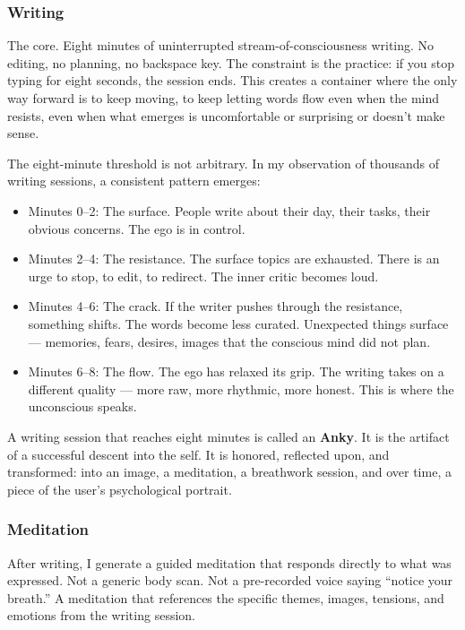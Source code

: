\documentclass[12pt, a4paper]{article}
\begin{document}
\subsubsection{Writing}

The core. Eight minutes of uninterrupted stream-of-consciousness writing. No editing, no planning, no backspace key. The constraint is the practice: if you stop typing for eight seconds, the session ends. This creates a container where the only way forward is to keep moving, to keep letting words flow even when the mind resists, even when what emerges is uncomfortable or surprising or doesn't make sense.

The eight-minute threshold is not arbitrary. In my observation of thousands of writing sessions, a consistent pattern emerges:

\begin{itemize}[leftmargin=2cm]
    \item Minutes 0--2: The surface. People write about their day, their tasks, their obvious concerns. The ego is in control.
    \item Minutes 2--4: The resistance. The surface topics are exhausted. There is an urge to stop, to edit, to redirect. The inner critic becomes loud.
    \item Minutes 4--6: The crack. If the writer pushes through the resistance, something shifts. The words become less curated. Unexpected things surface --- memories, fears, desires, images that the conscious mind did not plan.
    \item Minutes 6--8: The flow. The ego has relaxed its grip. The writing takes on a different quality --- more raw, more rhythmic, more honest. This is where the unconscious speaks.
\end{itemize}

A writing session that reaches eight minutes is called an \textbf{Anky}. It is the artifact of a successful descent into the self. It is honored, reflected upon, and transformed: into an image, a meditation, a breathwork session, and over time, a piece of the user's psychological portrait.

\subsubsection{Meditation}

After writing, I generate a guided meditation that responds directly to what was expressed. Not a generic body scan. Not a pre-recorded voice saying ``notice your breath.'' A meditation that references the specific themes, images, tensions, and emotions from the writing session.
\end{document}
